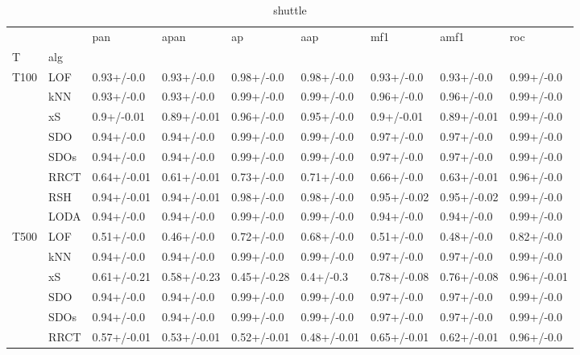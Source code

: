\begin{table}
\centering
\caption{shuttle}
\begin{tabular}{lllllllll}
\toprule
      &      &          pan &         apan &           ap &          aap &          mf1 &         amf1 &          roc \\
T & alg &              &              &              &              &              &              &              \\
\midrule
T100 & LOF &   0.93+/-0.0 &   0.93+/-0.0 &   0.98+/-0.0 &   0.98+/-0.0 &   0.93+/-0.0 &   0.93+/-0.0 &   0.99+/-0.0 \\
      & kNN &   0.93+/-0.0 &   0.93+/-0.0 &   0.99+/-0.0 &   0.99+/-0.0 &   0.96+/-0.0 &   0.96+/-0.0 &   0.99+/-0.0 \\
      & xS &   0.9+/-0.01 &  0.89+/-0.01 &   0.96+/-0.0 &   0.95+/-0.0 &   0.9+/-0.01 &  0.89+/-0.01 &   0.99+/-0.0 \\
      & SDO &   0.94+/-0.0 &   0.94+/-0.0 &   0.99+/-0.0 &   0.99+/-0.0 &   0.97+/-0.0 &   0.97+/-0.0 &   0.99+/-0.0 \\
      & SDOs &   0.94+/-0.0 &   0.94+/-0.0 &   0.99+/-0.0 &   0.99+/-0.0 &   0.97+/-0.0 &   0.97+/-0.0 &   0.99+/-0.0 \\
      & RRCT &  0.64+/-0.01 &  0.61+/-0.01 &   0.73+/-0.0 &   0.71+/-0.0 &   0.66+/-0.0 &  0.63+/-0.01 &   0.96+/-0.0 \\
      & RSH &  0.94+/-0.01 &  0.94+/-0.01 &   0.98+/-0.0 &   0.98+/-0.0 &  0.95+/-0.02 &  0.95+/-0.02 &   0.99+/-0.0 \\
      & LODA &   0.94+/-0.0 &   0.94+/-0.0 &   0.99+/-0.0 &   0.99+/-0.0 &   0.94+/-0.0 &   0.94+/-0.0 &   0.99+/-0.0 \\
T500 & LOF &   0.51+/-0.0 &   0.46+/-0.0 &   0.72+/-0.0 &   0.68+/-0.0 &   0.51+/-0.0 &   0.48+/-0.0 &   0.82+/-0.0 \\
      & kNN &   0.94+/-0.0 &   0.94+/-0.0 &   0.99+/-0.0 &   0.99+/-0.0 &   0.97+/-0.0 &   0.97+/-0.0 &   0.99+/-0.0 \\
      & xS &  0.61+/-0.21 &  0.58+/-0.23 &  0.45+/-0.28 &    0.4+/-0.3 &  0.78+/-0.08 &  0.76+/-0.08 &  0.96+/-0.01 \\
      & SDO &   0.94+/-0.0 &   0.94+/-0.0 &   0.99+/-0.0 &   0.99+/-0.0 &   0.97+/-0.0 &   0.97+/-0.0 &   0.99+/-0.0 \\
      & SDOs &   0.94+/-0.0 &   0.94+/-0.0 &   0.99+/-0.0 &   0.99+/-0.0 &   0.97+/-0.0 &   0.97+/-0.0 &   0.99+/-0.0 \\
      & RRCT &  0.57+/-0.01 &  0.53+/-0.01 &  0.52+/-0.01 &  0.48+/-0.01 &  0.65+/-0.01 &  0.62+/-0.01 &   0.96+/-0.0 \\

\end{tabular}
\end{table}
